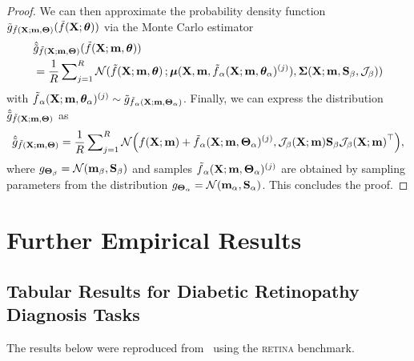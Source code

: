 \begin{appendices}
\begin{proof}
We can then approximate the probability density function $\tilde{g}_{\smash{\tilde{f}}(\mathbf X ; \mathbf{m}, \boldsymbol{\Theta})}(\smash{\tilde{f}}(\mathbf X ; {\boldsymbol{\theta}}))$ via the Monte Carlo estimator
\begin{align}
\begin{split}
    &
    \hat{\tilde{g}}_{\smash{\tilde{f}}(\mathbf X ; \mathbf{m}, \boldsymbol{\Theta})}(\smash{\tilde{f}}(\mathbf X ; \mathbf{m}, {\boldsymbol{\theta}}))
    \\
    &
    =
    \frac{1}{R} \sum\nolimits_{j=1}^{R} \mathcal{N}(\smash{\tilde{f}}(\mathbf X ; \mathbf{m}, {\boldsymbol{\theta}}) \,; \bm{\mu}(\mathbf X, \mathbf{m}, \smash{\tilde{f}}_{\alpha}(\mathbf X ; \mathbf{m}, {\boldsymbol{\theta}}_{\alpha})^{(j)}) , \bm{\Sigma}(\mathbf X ; \mathbf{m}, \mathbf{S}_{\beta}, \mathcal{J}_{\beta}) )
\end{split}
\end{align}
with $\smash{\tilde{f}}_{\alpha}(\mathbf X ; \mathbf{m}, {\boldsymbol{\theta}}_{\alpha})^{(j)} \sim \tilde{g}_{\smash{\tilde{f}}_{\alpha}(\mathbf X ; \mathbf{m}, \boldsymbol{\Theta}_{\alpha})}$.
Finally, we can express the distribution $\hat{\tilde{g}}_{\smash{\tilde{f}}(\mathbf X ; \mathbf{m}, \boldsymbol{\Theta})}$ as
\begin{align}
    \hat{\tilde{g}}_{\smash{\tilde{f}}(\mathbf X ; \mathbf{m}, \boldsymbol{\Theta})}
    =
    \frac{1}{R} \sum\nolimits_{j=1}^{R} \mathcal{N}\Big(f(\mathbf X ; \mathbf{m}) + \smash{\tilde{f}}_{\alpha}(\mathbf X ; \mathbf{m}, \boldsymbol{\Theta}_{\alpha})^{(j)}, \mathcal{J}_{\beta}(\mathbf X ; \mathbf{m}) \mathbf{S}_{\beta} {\mathcal{J}_{\beta}(\mathbf X ; \mathbf{m})}^\top \Big) ,
\end{align}
where $g_{\boldsymbol{\Theta}_{\beta}} = \mathcal{N}(\mathbf{m}_{\beta}, \mathbf{S}_{\beta})$ and samples $\smash{\tilde{f}}_{\alpha}(\mathbf X ; \mathbf{m}, \boldsymbol{\Theta}_{\alpha})^{(j)}$ are obtained by sampling parameters from the distribution \mbox{$g_{\boldsymbol{\Theta}_{\alpha}} =  \mathcal{N}(\mathbf{m}_{\alpha}, \mathbf{S}_{\alpha})$}.
This concludes the proof.
\end{proof}



\clearpage




\section{Further Empirical Results}
\label{appsec:empirical_results}




\subsection{Tabular Results for Diabetic Retinopathy Diagnosis Tasks}
\label{appsec:retina_tabular}

The results below were reproduced from~\citet{Band2021benchmarking} using the \textsc{retina} benchmark.



\end{appendices}
